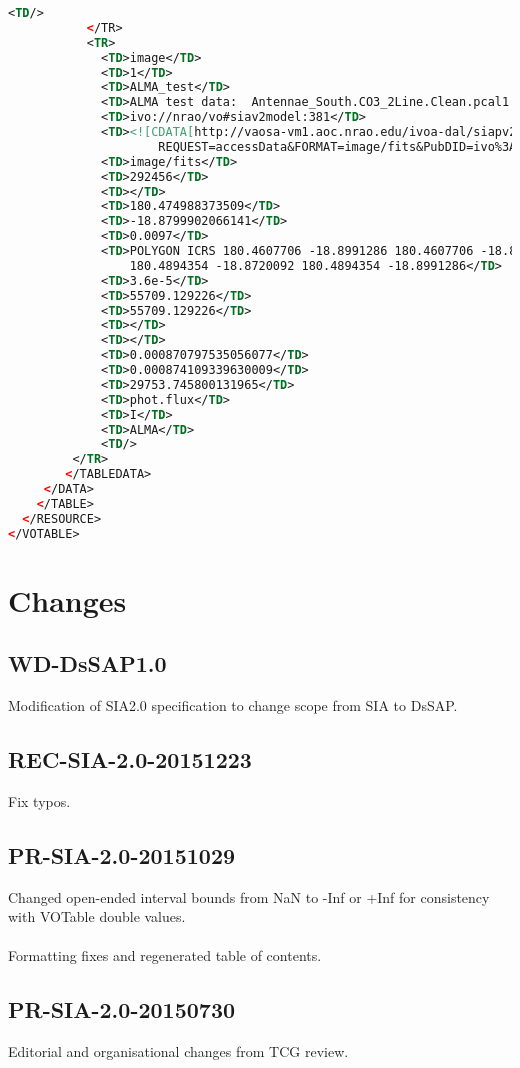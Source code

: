 \documentclass[11pt,a4paper]{ivoa}
\begin{document}
\begin{lstlisting}[basicstyle=\scriptsize,language=XML]
             <TD/> 
           </TR> 
           <TR>
             <TD>image</TD> 
             <TD>1</TD> 
             <TD>ALMA_test</TD> 
             <TD>ALMA test data:  Antennae_South.CO3_2Line.Clean.pcal1.image.mom.weighted_dispersion_coord.fits</TD>  
             <TD>ivo://nrao/vo#siav2model:381</TD> 
             <TD><![CDATA[http://vaosa-vm1.aoc.nrao.edu/ivoa-dal/siapv2-vao/sync?
                     REQUEST=accessData&FORMAT=image/fits&PubDID=ivo%3A%2F%2Fnrao%2Fvo%23image-ByCXy3]]></TD> 
             <TD>image/fits</TD> 
             <TD>292456</TD> 
             <TD></TD> 
             <TD>180.474988373509</TD> 
             <TD>-18.8799902066141</TD> 
             <TD>0.0097</TD> 
             <TD>POLYGON ICRS 180.4607706 -18.8991286 180.4607706 -18.8720092
                 180.4894354 -18.8720092 180.4894354 -18.8991286</TD> 
             <TD>3.6e-5</TD> 
             <TD>55709.129226</TD> 
             <TD>55709.129226</TD> 
             <TD></TD> 
             <TD></TD> 
             <TD>0.000870797535056077</TD> 
             <TD>0.000874109339630009</TD> 
             <TD>29753.745800131965</TD> 
             <TD>phot.flux</TD> 
             <TD>I</TD> 
             <TD>ALMA</TD> 
             <TD/> 
         </TR> 
        </TABLEDATA> 
     </DATA> 
    </TABLE> 
  </RESOURCE> 
</VOTABLE>
\end{lstlisting}
\appendix
\section{Changes}
\subsection{WD-DsSAP1.0}
Modification of SIA2.0 specification to change scope from SIA to DsSAP.
\subsection{REC-SIA-2.0-20151223}
Fix typos.
\subsection{PR-SIA-2.0-20151029}
Changed open-ended interval bounds from NaN to -Inf or +Inf for consistency with VOTable double values. \\ \\
Formatting fixes and regenerated table of contents.
\subsection{PR-SIA-2.0-20150730}
Editorial and organisational changes from TCG review.
\end{document}
